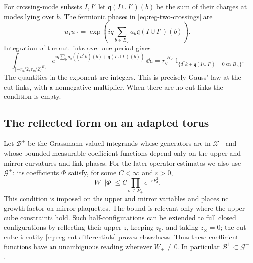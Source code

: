For crossing-mode subsets $I,I'$ let
$\mathfrak q(I\cup I')(b)$ be the sum of their charges at modes lying
over $b$. The fermionic phases in \eqref{eq:reg-two-crossings} are
\[
 u_Iu_{I'}=\exp\left(iq\sum_{b\in B_\times}
                              a_b\mathfrak q(I\cup I')(b)\right).
\]
Integration of the cut links over one period gives
\begin{equation}\label{eq:reg-gauss-indicator}
 \int_{[-r_q/2,r_q/2)^{B_\times}}
 e^{iq\sum_ba_b((d^*k)(b)+\mathfrak q(I\cup I')(b))}\,\dd a
 =r_q^{|B_\times|}
   1_{\{d^*k+\mathfrak q(I\cup I')=0\text{ on }B_\times\}}.
\end{equation}
The quantities in the exponent are integers. This is precisely
Gauss' law at the cut links, with a nonnegative multiplier. When
there are no cut links the condition is empty.

\subsection{The reflected form on an adapted torus}
\label{subsec:reg-reflected-form}

Let $\mathcal B^+$ be the Grassmann-valued integrands whose
generators are in $\mathcal X_+$ and whose bounded measurable
coefficient functions depend only on the upper and mirror
curvatures and link phases. For the later operator estimates we
also use $\mathcal G^+$: its coefficients $\Phi$ satisfy, for some
$C<\infty$ and $\varepsilon>0$,
\begin{equation}\label{eq:reg-upper-growth}
 W_+|\Phi|\le C\prod_{\sigma\in P_+}e^{-\varepsilon F_\sigma^2}.
\end{equation}
This condition is imposed on the upper and mirror variables and
places no growth factor on mirror plaquettes. The bound is relevant
only where the upper cube constraints hold. Such half-configurations
can be extended to full closed configurations by reflecting their
upper $z$, keeping $z_0$, and taking $z_\times=0$; the cut-cube
identity \eqref{eq:reg-cut-differentials} proves closedness. Thus
these coefficient functions have an unambiguous reading wherever
$W_+\ne0$. In particular $\mathcal B^+\subset\mathcal G^+$.

